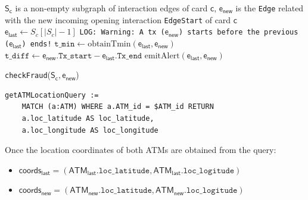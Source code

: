 \begin{itemize}
    \begin{algorithm}[H]
      \small
      \begin{algorithmic}[1]
      \REQUIRE $\mathsf{S_c}$ is a non-empty subgraph of interaction edges of card $\mathsf{c}$, $\mathsf{e_{new}}$ is the \texttt{Edge} related with the new incoming opening interaction \texttt{EdgeStart} of card $\mathsf{c}$
      \STATE $\mathsf{e_{last}} \gets S_c[|S_c| - 1]$ 
          \STATE \texttt{LOG: Warning: A tx ($\mathsf{e_{new}}$) starts before the previous ($\mathsf{e_{last}}$) ends!} 
          \RETURN
      \ENDIF
          \STATE $\texttt{t\_min} \gets \text{obtainTmin}(\mathsf{e_{last}}, \mathsf{e_{new}})$\label{line:obtainTmin}
          \STATE $\texttt{t\_diff} \gets \mathsf{e_{new}}.\texttt{Tx\_start} - \mathsf{e_{last}}.\texttt{Tx\_end}$
            \STATE $\text{emitAlert}(\mathsf{e_{last}}, \mathsf{e_{new}})$\label{line:emitAlert}
          \ENDIF
      \ENDIF
      \end{algorithmic}
      \caption{\texttt{checkFraud}($\mathsf{S_c, e_{new}}$)}
      \label{alg:check-fraud-impl}
    \end{algorithm}

    
    \begin{center}
    \lstset{style=cypherStyle}
    \begin{lstlisting}[caption={Code of the constructed \texttt{Cypher} query in \texttt{Go} to obtain the location coordinates of an ATM with its id on the Neo4j graph database}, label={lst:cypherQueryCoords}]
    getATMLocationQuery := 
    MATCH (a:ATM) WHERE a.ATM_id = $ATM_id RETURN 
    a.loc_latitude AS loc_latitude, 
    a.loc_longitude AS loc_longitude
    \end{lstlisting}
    \end{center}

    Once the location coordinates of both ATMs are obtained from the query:
    \begin{itemize}
        \item  $\mathsf{coords_{last}} = (\mathsf{ATM_{last}}.\texttt{loc\_latitude}, \mathsf{ATM_{last}}.\texttt{loc\_logitude})$ 
        \item  $\mathsf{coords_{new}} = (\mathsf{ATM_{new}}.\texttt{loc\_latitude}, \mathsf{ATM_{new}}.\texttt{loc\_logitude})$
    \end{itemize}
    

\end{itemize}
